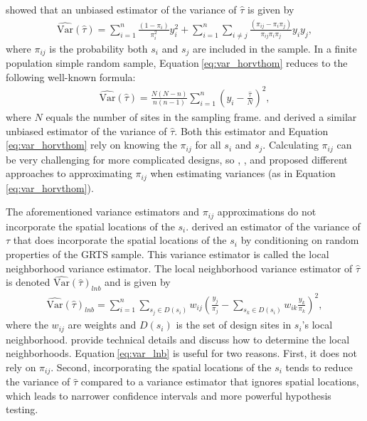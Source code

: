\documentclass[
  shortnames]{jss}
\begin{document}
\citet{horvitz1952generalization} showed that an unbiased estimator of
the variance of \(\hat{\tau}\) is given by
\begin{align}\label{eq:var_horvthom}
  \hat{\text{Var}}(\hat{\tau}) = \sum_{i = 1}^n \frac{(1 - \pi_i)}{\pi_i^2} y_i^2 + \sum_{i = 1}^n \sum_{i \neq j} \frac{(\pi_{ij} - \pi_i \pi_j)}{\pi_{ij} \pi_i \pi_j}y_i y_j ,
\end{align} where \(\pi_{ij}\) is the probability both \(s_i\) and
\(s_j\) are included in the sample. In a finite population simple random
sample, Equation\(~\)\ref{eq:var_horvthom} reduces to the following
well-known formula: \begin{align}\label{eq:var_irs}
  \hat{\text{Var}}(\hat{\tau}) = \frac{N(N - n)}{n(n - 1)}\sum_{i = 1}^n \left(y_i - \frac{\hat{\tau}}{N} \right)^2 ,
\end{align} where \(N\) equals the number of sites in the sampling
frame. \citet{sen1953estimate} and \citet{yates1953selection} derived a
similar unbiased estimator of the variance of \(\hat{\tau}\). Both this
estimator and Equation\(~\)\ref{eq:var_horvthom} rely on knowing the
\(\pi_{ij}\) for all \(s_i\) and \(s_j\). Calculating \(\pi_{ij}\) can
be very challenging for more complicated designs, so
\citet{hartley1962sampling}, \citet{overton1987sampling}, and
\citet{brewer2002combined} proposed different approaches to
approximating \(\pi_{ij}\) when estimating variances (as in
Equation\(~\)\ref{eq:var_horvthom}).

The aforementioned variance estimators and \(\pi_{ij}\) approximations
do not incorporate the spatial locations of the \(s_i\).
\citet{stevens2003variance} derived an estimator of the variance of
\(\tau\) that does incorporate the spatial locations of the \(s_i\) by
conditioning on random properties of the GRTS sample. This variance
estimator is called the local neighborhood variance estimator. The local
neighborhood variance estimator of \(\hat{\tau}\) is denoted
\(\hat{\text{Var}}(\hat{\tau})_{lnb}\) and is given by
\begin{align}\label{eq:var_lnb}
  \hat{\text{Var}}(\hat{\tau})_{lnb} = \sum_{i = 1}^n \sum_{s_j \in D(s_i)} w_{ij} \left(\frac{y_j}{\pi_j} - \sum_{s_k \in D(s_i)} w_{ik} \frac{y_k}{\pi_k} \right)^2 ,
\end{align} where the \(w_{ij}\) are weights and \(D(s_i)\) is the set
of design sites in \(s_i\)'s local neighborhood.
\citet{stevens2003variance} provide technical details and discuss how to
determine the local neighborhoods. Equation\(~\)\ref{eq:var_lnb} is
useful for two reasons. First, it does not rely on \(\pi_{ij}\). Second,
incorporating the spatial locations of the \(s_i\) tends to reduce the
variance of \(\hat{\tau}\) compared to a variance estimator that ignores
spatial locations, which leads to narrower confidence intervals and more
powerful hypothesis testing.
\end{document}
